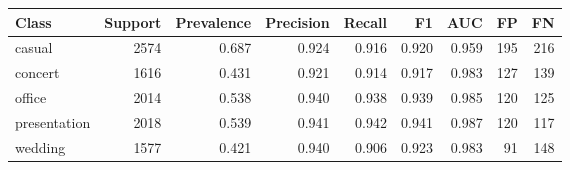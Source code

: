 \begin{tabular}{lrrrrrrrr}
\toprule
Class & Support & Prevalence & Precision & Recall & F1 & AUC & FP & FN \\
\midrule
casual & 2574 & 0.687 & 0.924 & 0.916 & 0.920 & 0.959 & 195 & 216 \\
concert & 1616 & 0.431 & 0.921 & 0.914 & 0.917 & 0.983 & 127 & 139 \\
office & 2014 & 0.538 & 0.940 & 0.938 & 0.939 & 0.985 & 120 & 125 \\
presentation & 2018 & 0.539 & 0.941 & 0.942 & 0.941 & 0.987 & 120 & 117 \\
wedding & 1577 & 0.421 & 0.940 & 0.906 & 0.923 & 0.983 & 91 & 148 \\
\bottomrule
\end{tabular}
